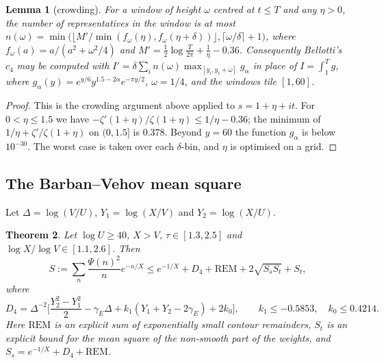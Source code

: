 \documentclass[11pt]{amsart}
\numberwithin{equation}{section}
\newtheorem{theorem}{Theorem}[section]
\newtheorem{lemma}[theorem]{Lemma}
\theoremstyle{definition}
\theoremstyle{remark}
\begin{document}
\begin{lemma}[crowding]\label{lem:crowd}
For a window of height $\omega$ centred at $t \le T$ and any $\eta > 0$, the number of representatives in the window is at most
$n(\omega) = \min\big(\lfloor M'/\min(f_\omega(\eta), f_\omega(\eta+\delta))\rfloor, \lceil \omega/\delta\rceil + 1\big)$,
where $f_\omega(a) = a/(a^2 + \omega^2/4)$ and $M' = \frac12\log\frac T{2\pi} + \frac1\eta - 0.36$.
Consequently Bellotti's $c_4$ \cite[(4.13)--(4.14)]{Bellotti} may be computed with
$I' = \delta\sum_i n(\omega)\max_{[y_i, y_i+\omega]} g_\alpha$ in place of $I = \int_1^T g$, where $g_\alpha(y) = e^{y/6}y^{1.5-2\alpha}e^{-\pi y/2}$, $\omega = 1/4$, and the windows tile $[1,60]$.
\end{lemma}

\begin{proof}
This is the crowding argument above applied to $s = 1+\eta+it$.
For $0 < \eta \le 1.5$ we have $-\zeta'(1+\eta)/\zeta(1+\eta) \le 1/\eta - 0.36$; the minimum of $1/\eta + \zeta'/\zeta(1+\eta)$ on $(0, 1.5]$ is $0.378$.
Beyond $y = 60$ the function $g_\alpha$ is below $10^{-30}$.
The worst case is taken over each $\delta$-bin, and $\eta$ is optimised on a grid.
\end{proof}

\subsection{The Barban--Vehov mean square}
Let $\Delta = \log(V/U)$, $Y_1 = \log(X/V)$ and $Y_2 = \log(X/U)$.

\begin{theorem}\label{thm:G}
Let $\log U \ge 40$, $X > V$, $\tau \in [1.3, 2.5]$ and $\log X/\log V \in [1.1, 2.6]$. Then
\[
S := \sum_n\frac{\Psi(n)^2}{n}e^{-n/X} \le e^{-1/X} + D_4 + \mathrm{REM} + 2\sqrt{S_sS_t} + S_t,
\]
where
\[
D_4 = \Delta^{-2}\Big[\frac{Y_2^2 - Y_1^2}{2} - \gamma_E\Delta + k_1(Y_1+Y_2-2\gamma_E) + 2k_0\Big], \qquad k_1 \le -0.5853,\quad k_0 \le 0.4214 .
\]
Here $\mathrm{REM}$ is an explicit sum of exponentially small contour remainders, $S_t$ is an explicit bound for the mean square of the non-smooth part of the weights, and $S_s = e^{-1/X} + D_4 + \mathrm{REM}$.
\end{theorem}
\end{document}
